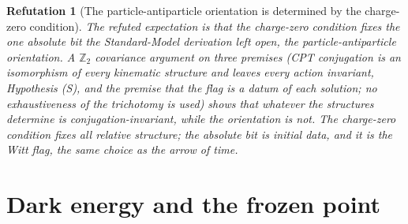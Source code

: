\documentclass[11pt]{article}
\newtheorem{refutation}[theorem]{Refutation}
\theoremstyle{definition}
\theoremstyle{plain}
\providecommand{\Z}{}\renewcommand{\Z}{\mathbb{Z}}
\begin{document}
\begin{refutation}[The particle-antiparticle orientation is determined by the charge-zero condition]\label{c:refuted.the-particle-antiparticle-orientation-is-determi}
The refuted expectation is that the charge-zero condition fixes the one absolute bit the Standard-Model derivation left open, the particle-antiparticle orientation. A $\Z_{2}$ covariance argument on three premises (CPT conjugation is an isomorphism of every kinematic structure and leaves every action invariant, Hypothesis (S), and the premise that the flag is a datum of each solution; no exhaustiveness of the trichotomy is used) shows that whatever the structures determine is conjugation-invariant, while the orientation is not. The charge-zero condition fixes all relative structure; the absolute bit is initial data, and it is the Witt flag, the same choice as the arrow of time.
\end{refutation}

\section{Dark energy and the frozen point}
\end{document}
